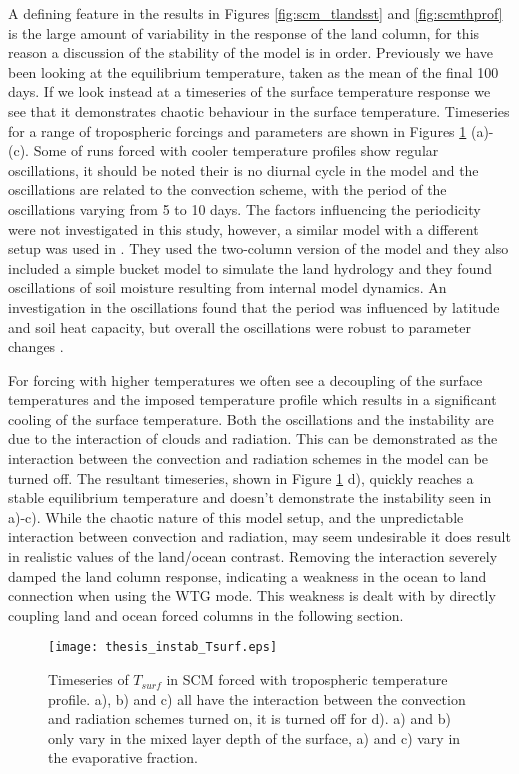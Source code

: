 A defining feature in the results in Figures \ref{fig:scm_tlandsst} and 
\ref{fig:scmthprof} is the large amount of variability in the response of the 
land column, for this reason a discussion of the stability of the model is in 
order. Previously we have been looking at the equilibrium temperature, taken as 
the mean of the final 100 days. If we look instead at a timeseries of the 
surface temperature response we see that it demonstrates chaotic behaviour in 
the surface temperature. Timeseries for a range of tropospheric forcings and 
parameters are shown in Figures \ref{fig:scmts} (a)-(c). Some of runs forced 
with cooler temperature profiles show regular oscillations, it should be noted 
their is no diurnal cycle in the model and the oscillations are related to the 
convection scheme, with the period of the oscillations varying from 5 to 10 
days. The factors influencing the periodicity were not investigated in this 
study, however, a similar model with a different setup was used in 
\citet{Abbot2007}.  They used the two-column version of the model and they also 
included a simple bucket model to simulate the land hydrology and they found 
oscillations of soil moisture resulting from internal model dynamics.  An 
investigation in the oscillations found that the period was influenced by 
latitude and soil heat capacity, but overall the oscillations were robust to 
parameter changes \citep{Abbot2007}.

For forcing with higher temperatures we often see a decoupling of the surface 
temperatures and the imposed temperature profile which results in a significant 
cooling of the surface temperature.  Both the oscillations and the instability 
are due to the interaction of clouds and radiation. This can be demonstrated as 
the interaction between the convection and radiation schemes in the model can be 
turned off. The resultant timeseries, shown in Figure \ref{fig:scmts} d), 
quickly reaches a stable equilibrium temperature and doesn't demonstrate the 
instability seen in a)-c). While the chaotic nature of this model setup, and the 
unpredictable interaction between convection and radiation, may seem undesirable 
it does result in realistic values of the land/ocean contrast.  Removing the 
interaction severely damped the land column response, indicating a weakness in 
the ocean to land connection when using the WTG mode.  This weakness is dealt 
with by directly coupling land and ocean forced columns in the following 
section.

\begin{figure}[ht]
\texttt{[image: thesis\_instab\_Tsurf.eps]}
\caption{Timeseries of $T_{surf}$ in SCM forced with tropospheric temperature 
profile. a), b) and c) all have the interaction between the convection and 
radiation schemes turned on, it is turned off for d). a) and b) only vary in the 
mixed layer depth of the surface, a) and c) vary in the evaporative fraction.}
\label{fig:scmts}
\end{figure}

